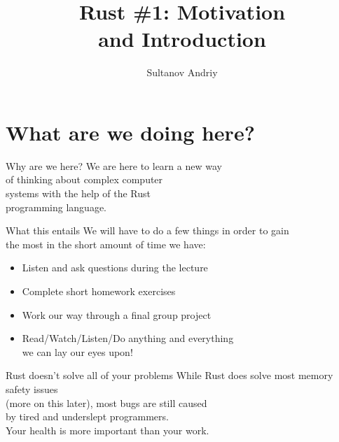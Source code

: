 \documentclass[usenames,dvipsnames,10pt,aspectratio=169]{beamer}
\title[Rust \#1]{Rust \#1: Motivation \\ \vspace{0.1cm}and Introduction}
\author[Sultanov Andriy]{Sultanov Andriy}
\institute{APPS@UCU}
\begin{document}
\begin{frame}
\titlepage
\end{frame}

\begin{frame}{\contentsname}
\tableofcontents
\end{frame}


\section{What are we doing here?}

\begin{frame}{Why are we here?}
\Large	
We are here to learn a new way \\
of thinking about complex computer \\
systems with the help of the Rust \\
programming language.\\
\end{frame}

\begin{frame}{What this entails}
\large	
We will have to do a few things in order to gain\\
the most in the short amount of time we have:\\
\vspace{0.4cm}
\begin{itemize}[label=$\bullet$]
	\item Listen and ask questions during the lecture
	\item Complete short homework exercises
	\item Work our way through a final group project
	\item Read/Watch/Listen/Do anything and everything\\ 
		we can lay our eyes upon!
\end{itemize}
\end{frame}

\begin{frame}{Rust doesn't solve all of your problems}
\large
While Rust does solve most memory safety issues\\
(more on this later), most bugs are still caused\\
by tired and underslept programmers.\\
\vspace{0.2cm}
\textcolor{ucuyellow}{Your health is more important than your work.}\\
\end{frame}
\end{document}
